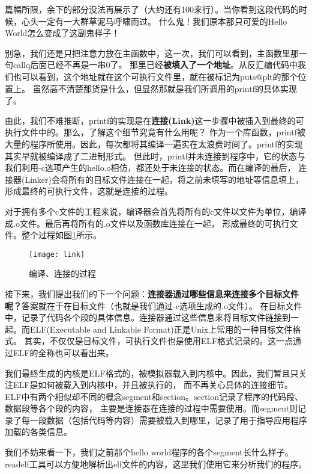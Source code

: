 篇幅所限，余下的部分没法再展示了（大约还有100来行）。当你看到这段代码的时候，心头一定有一大群草泥马呼啸而过。
什么鬼！我们原本那只可爱的Hello World怎么变成了这副鬼样子！

别急，我们还是只把注意力放在主函数中，这一次，我们可以看到，主函数里那一句callq后面已经不再是一串0了。
那里已经\textbf{被填入了一个地址}。从反汇编代码中我们也可以看到，这个地址就在这个可执行文件里，就在被标记为puts@plt的那个位置上。
虽然高不清楚那货是什么，但显然那就是我们所调用的printf的具体实现了。

由此，我们不难推断，printf的实现是在\textbf{连接(Link)}这一步骤中被插入到最终的可执行文件中的。那么，了解这个细节究竟有什么用呢？
作为一个库函数，printf被大量的程序所使用。因此，每次都将其编译一遍实在太浪费时间了。printf的实现其实早就被编译成了二进制形式。
但此时，printf并未连接到程序中，它的状态与我们利用-c选项产生的hello.o相仿，都还处于未连接的状态。而在编译的最后，
连接器(Linker)会将所有的目标文件连接在一起，将之前未填写的地址等信息填上，形成最终的可执行文件，这就是连接的过程。

对于拥有多个c文件的工程来说，编译器会首先将所有的c文件以文件为单位，编译成.o文件。最后再将所有的.o文件以及函数库连接在一起，
形成最终的可执行文件。整个过程如图\ref{fig:link}所示。

\begin{figure}[htbp]
  \centering
  \texttt{[image: link]}
  \caption{编译、连接的过程}\label{fig:link} 
\end{figure}

接下来，我们提出我们的下一个问题：\textbf{连接器通过哪些信息来连接多个目标文件呢？}答案就在于在目标文件（也就是我们通过-c选项生成的.o文件）。
在目标文件中，记录了代码各个段的具体信息。连接器通过这些信息来将目标文件链接到一起。而ELF(Executable and Linkable Format)正是Unix上常用的一种目标文件格式。
其实，不仅仅是目标文件，可执行文件也是使用ELF格式记录的。这一点通过ELF的全称也可以看出来。

我们最终生成的内核是ELF格式的，被模拟器载入到内核中。因此，我们暂且只关注ELF是如何被载入到内核中，并且被执行的，
而不再关心具体的连接细节。ELF中有两个相似却不同的概念segment和section。section记录了程序的代码段、数据段等各个段的内容，
主要是连接器在连接的过程中需要使用。而segment则记录了每一段数据（包括代码等内容）需要被载入到哪里，记录了用于指导应用程序加载的各类信息。

我们不妨来看一下，我们之前那个hello world程序的各个segment长什么样子。readelf工具可以方便地解析出elf文件的内容，这里我们使用它来分析我们的程序。

